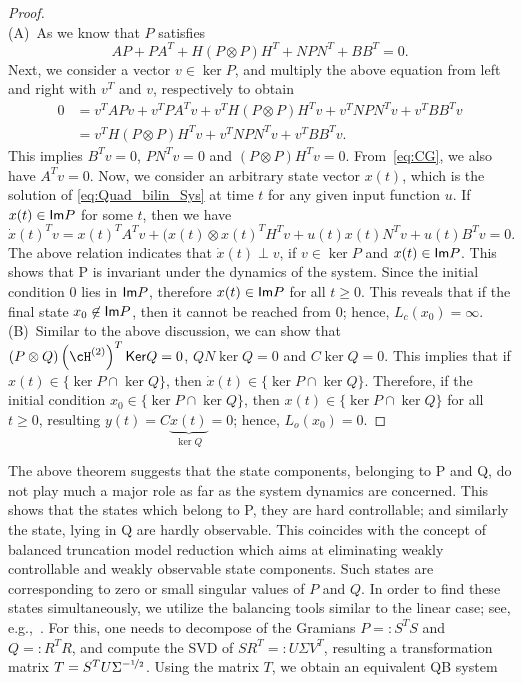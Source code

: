 \begin{proof}
\mbox{}\\
(A)~As we know that $P$ satisfies
\begin{equation}\label{eq:CG}
AP + PA^T + H(P\otimes P)H^T +NPN^T + BB^T =0.
\end{equation}
Next, we consider a vector  $v \in \ker P$, and multiply the above equation from left and right with $v^T$ and $v$, respectively to obtain
\begin{align*}
0&= v^TAPv + v^TPA^Tv + v^TH(P\otimes P)H^Tv +v^TNPN^Tv + v^TBB^Tv\\
&=v^TH(P\otimes P)H^Tv +v^TNPN^Tv + v^TBB^Tv.
\end{align*}
This implies $B^Tv = 0$, $PN^T v=0$ and $(P\otimes P)H^T v=0$. From~\eqref{eq:CG}, we also have $A^Tv = 0$. Now, we consider an arbitrary state vector $x(t)$, which is the solution of \eqref{eq:Quad_bilin_Sys} at time $t$ for any given input function $u$. If $x(t) \in {\mathsf{Im}} P $ for some $t$, then we have
\begin{equation*}
\dot{x}(t)^Tv = x(t)^TA^Tv + (x(t)\otimes x(t)^TH^Tv + u(t)x(t)N^Tv + u(t)B^Tv = 0.
\end{equation*}
The above relation indicates that $\dot x(t) \perp v$, if $v\in \ker P$ and $x(t) \in {\mathsf{Im}} P$.  This shows that \im P is invariant under the dynamics of the system. Since the initial condition $0$ lies in ${\mathsf{Im}} P$, therefore $x(t) \in {\mathsf{Im}} P$ for all $t\geq 0$. This reveals that if the final state $x_0 \not\in {\mathsf{Im}} P$, then it cannot be reached from $0$; hence, $L_c(x_0) =\infty$.\\
(B)~Similar to the above discussion, we can show that $(P \otimes Q )  \left(\cH^{(2)}\right)^T \ker Q = 0$, $QN\ker Q =0$ and $C\ker Q =0$. This implies that if $x(t) \in  \{\ker P \cap \ker Q\}$, then $\dot x(t)  \in\{\ker P \cap \ker Q\}$.  Therefore, if the initial condition $x_0 \in   \{\ker P \cap \ker Q\}$, then $x(t)\in  \{\ker P \cap \ker Q\}$ for all $t\geq 0$, resulting $y(t)=C\underbrace{x(t)}_{\ker Q} = 0$; hence, $L_o(x_0) = 0$.
\end{proof}
The above theorem suggests that the state components, belonging to \ker P and \ker Q, do not play much a major role as far as the system dynamics are concerned. This shows that the states which belong to \ker P, they are hard controllable; and similarly the state, lying in \ker Q are hardly observable. This coincides with the concept of balanced truncation model reduction which aims at eliminating weakly controllable and weakly observable state components. Such states are corresponding to zero or small singular values of $P$ and $Q$. In order to find these states simultaneously, we utilize the balancing tools similar to the linear case; see, e.g.,~\cite{moral1994,morAnt05}. For this, one needs to decompose of the Gramians $P =: S^TS$  and $Q =: R^TR$, and compute the SVD of $ SR^T =: U\Sigma V^T $, resulting a transformation matrix $T = S^TU\Sigma^{-\nicefrac{1}{2}}$. Using the matrix $T$, we obtain an equivalent QB system
